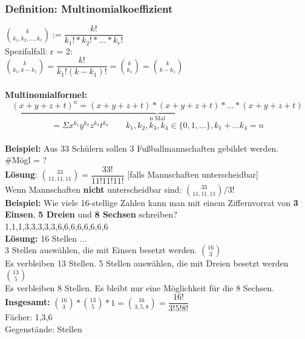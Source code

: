 \subsubsection{Definition: Multinomialkoeffizient}
$\binom{k}{k_1,k_2,...,k_r} := \dfrac{k!}{k_1!*k_2!*...*k_r!}$\medskip\\
Spezifalfall: r = 2:\medskip\\
$\binom{k}{k_1,k-k_1}=\dfrac{k!}{k_1!(k-k_1)!} = \binom{k}{k_1}= \binom{k}{k-k_1}$\\\\
\textbf{Multinomialformel: } $$\underbrace{(x+y+z+t)^n = (x+y+z+t)*(x+y+z+t)*...*(x+y+z+t)}_\text{n Mal}$$ 
$$=\Sigma x^{k_1}y^{k_2}z^{k_3}t^{k_4} \qquad k_1, k_2, k_3, k_4 \in \{0,1,...\}, k_1 + ... k_4 = n$$\medskip\\
\textbf{Beispiel:} Aus 33 Schülern sollen 3 Fußballmannschaften gebildet werden.\\
\#Mögl = ?\medskip\\
\textbf{Lösung}: $\binom{33}{11,11,11}= \dfrac{33!}{11!11!11!}$ [falls Mannschaften unterscheidbar]\medskip\\
Wenn Mannschaften \textbf{nicht} unterscheidbar sind: $\binom{33}{11,11,11}/3!$\bigskip\\
\textbf{Beispiel:} Wie viele 16-stellige Zahlen kann man mit einem Ziffernvorrat von \textbf{3 Einsen}, \textbf{5 Dreien} und \textbf{8 Sechsen} schreiben? \medskip\\
1,1,1,3,3,3,3,3,6,6,6,6,6,6,6,6\medskip\\
\textbf{Lösung:} 16 Stellen \qedsymbol \qedsymbol \qedsymbol ... \qedsymbol\\
3 Stellen auswählen, die mit Einsen besetzt werden. $\binom{16}{3}$\\
Es verbleiben 13 Stellen. 5 Stellen auswählen, die mit Dreien besetzt werden $\binom{13}{5}$\\
Es verbleiben 8 Stellen. Es bleibt nur eine Möglichkeit für die 8 Sechsen.\medskip\\
\textbf{Insgesamt:} $\binom{16}{3}*\binom{13}{5}*1 = \binom{16}{3,5, 8} = \dfrac{16!}{3!5!8!}$\smallskip\\
Fächer: 1,3,6\\
Gegenstände: Stellen
